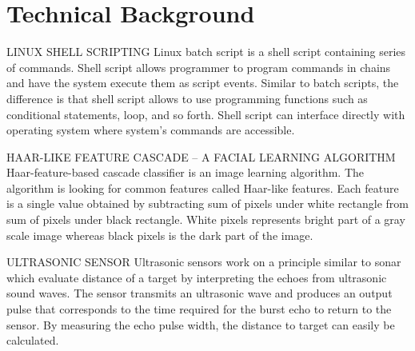 \section{Technical Background}
LINUX SHELL SCRIPTING
Linux batch script is a shell script containing series of commands. Shell script allows programmer to program commands in chains and have the system execute them as script events. Similar to batch scripts, the difference is that shell script allows to use programming functions such as conditional statements, loop, and so forth. Shell script can interface directly with operating system where system’s commands are accessible.

HAAR-LIKE FEATURE CASCADE – A FACIAL LEARNING ALGORITHM
Haar-feature-based cascade classifier is an image learning algorithm. The algorithm is looking for common features called Haar-like features. Each feature is a single value obtained by subtracting sum of pixels under white rectangle from sum of pixels under black rectangle. White pixels represents bright part of a gray scale image whereas black pixels is the dark part of the image.

ULTRASONIC SENSOR
Ultrasonic sensors work on a principle similar to sonar which evaluate distance of a target by interpreting the echoes from ultrasonic sound waves. The sensor transmits an ultrasonic wave and produces an output pulse that corresponds to the time required for the burst echo to return to the sensor. By measuring the echo pulse width, the distance to target can easily be calculated.


